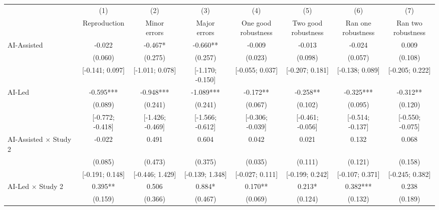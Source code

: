 \def\sym#1{\ifmmode^{#1}\else\(^{#1}\)\fi}
\begin{tabular}{l*{7}{c}}
\hline\hline
& (1) & (2) & (3) & (4) & (5) & (6) & (7)\\
                    &Reproduction   &\shortstack[c]{Minor\\errors}   &\shortstack[c]{Major\\errors}   &\shortstack[c]{One good\\robustness}   &\shortstack[c]{Two good\\robustness}   &\shortstack[c]{Ran one\\robustness}   &\shortstack[c]{Ran two\\robustness}   \\
\hline
AI-Assisted         &      -0.022   &      -0.467*  &      -0.660** &      -0.009   &      -0.013   &      -0.024   &       0.009   \\
                    &     (0.060)   &     (0.275)   &     (0.257)   &     (0.023)   &     (0.098)   &     (0.057)   &     (0.108)   \\
                    &[-0.141; 0.097]   &[-1.011; 0.078]   &[-1.170; -0.150]   &[-0.055; 0.037]   &[-0.207; 0.181]   &[-0.138; 0.089]   &[-0.205; 0.222]   \\
AI-Led              &      -0.595***&      -0.948***&      -1.089***&      -0.172** &      -0.258** &      -0.325***&      -0.312** \\
                    &     (0.089)   &     (0.241)   &     (0.241)   &     (0.067)   &     (0.102)   &     (0.095)   &     (0.120)   \\
                    &[-0.772; -0.418]   &[-1.426; -0.469]   &[-1.566; -0.612]   &[-0.306; -0.039]   &[-0.461; -0.056]   &[-0.514; -0.137]   &[-0.550; -0.075]   \\
AI-Assisted $\times$ Study 2&      -0.022   &       0.491   &       0.604   &       0.042   &       0.021   &       0.132   &       0.068   \\
                    &     (0.085)   &     (0.473)   &     (0.375)   &     (0.035)   &     (0.111)   &     (0.121)   &     (0.158)   \\
                    &[-0.191; 0.148]   &[-0.446; 1.429]   &[-0.139; 1.348]   &[-0.027; 0.111]   &[-0.199; 0.242]   &[-0.107; 0.371]   &[-0.245; 0.382]   \\
AI-Led $\times$ Study 2&       0.395** &       0.506   &       0.884*  &       0.170** &       0.213*  &       0.382***&       0.238   \\
                    &     (0.159)   &     (0.366)   &     (0.467)   &     (0.069)   &     (0.124)   &     (0.132)   &     (0.189)   \\

\end{tabular}
